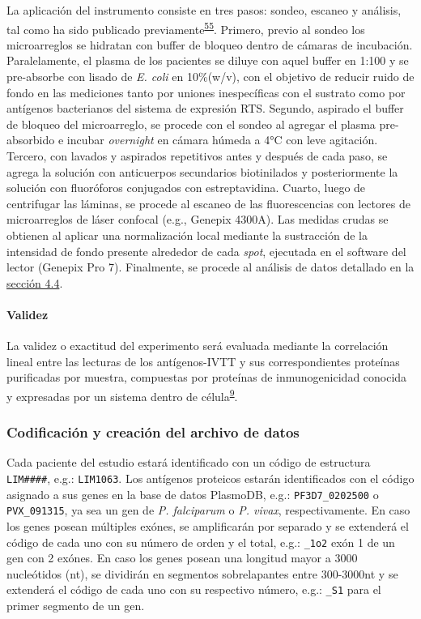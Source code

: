 \documentclass[a4paper]{article}
\let\oldparagraph\paragraph
\renewcommand{\paragraph}[1]{\oldparagraph{#1}\mbox{}}
\begin{document}
La aplicación del instrumento consiste en tres pasos: sondeo, escaneo y
análisis, tal como ha sido publicado
previamente\textsuperscript{\protect\hyperlink{ref-Driguez2015}{55}}.
Primero, previo al sondeo los microarreglos se hidratan con buffer de
bloqueo dentro de cámaras de incubación. Paralelamente, el plasma de los
pacientes se diluye con aquel buffer en 1:100 y se pre-absorbe con
lisado de \emph{E. coli} en 10\%(w/v), con el objetivo de reducir ruido
de fondo en las mediciones tanto por uniones inespecíficas con el
sustrato como por antígenos bacterianos del sistema de expresión RTS.
Segundo, aspirado el buffer de bloqueo del microarreglo, se procede con
el sondeo al agregar el plasma pre-absorbido e incubar \emph{overnight}
en cámara húmeda a 4°C con leve agitación. Tercero, con lavados y
aspirados repetitivos antes y después de cada paso, se agrega la
solución con anticuerpos secundarios biotinilados y posteriormente la
solución con fluoróforos conjugados con estreptavidina. Cuarto, luego de
centrifugar las láminas, se procede al escaneo de las fluorescencias con
lectores de microarreglos de láser confocal (e.g., Genepix 4300A). Las
medidas crudas se obtienen al aplicar una normalización local mediante
la sustracción de la intensidad de fondo presente alrededor de cada
\emph{spot}, ejecutada en el software del lector (Genepix Pro 7).
Finalmente, se procede al análisis de datos detallado en la
\protect\hyperlink{anadata}{sección 4.4}.

\hypertarget{validez}{\paragraph{Validez}\label{validez}}

La validez o exactitud del experimento será evaluada mediante la
correlación lineal entre las lecturas de los antígenos-IVTT y sus
correspondientes proteínas purificadas por muestra, compuestas por
proteínas de inmunogenicidad conocida y expresadas por un sistema dentro
de célula\textsuperscript{\protect\hyperlink{ref-crompton2010}{9}}.

\subsubsection{Codificación y creación del archivo de
datos}\label{codificacion-y-creacion-del-archivo-de-datos}

Cada paciente del estudio estará identificado con un código de
estructura \texttt{LIM\#\#\#\#}, e.g.: \texttt{LIM1063}. Los antígenos
proteicos estarán identificados con el código asignado a sus genes en la
base de datos PlasmoDB, e.g.: \texttt{PF3D7\_0202500} o
\texttt{PVX\_091315}, ya sea un gen de \emph{P. falciparum} o \emph{P.
vivax}, respectivamente. En caso los genes posean múltiples exónes, se
amplificarán por separado y se extenderá el código de cada uno con su
número de orden y el total, e.g.: \texttt{\_1o2} exón 1 de un gen con 2
exónes. En caso los genes posean una longitud mayor a 3000 nucleótidos
(nt), se dividirán en segmentos sobrelapantes entre 300-3000nt y se
extenderá el código de cada uno con su respectivo número, e.g.:
\texttt{\_S1} para el primer segmento de un gen.
\end{document}
